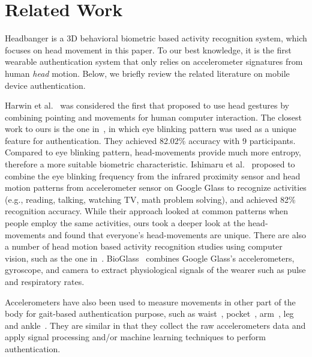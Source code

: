 \section{Related Work}\label{sec:related}
Headbanger is a 3D behavioral biometric based
activity recognition system, which focuses on head movement in this paper. 
To our best knowledge, it is the first wearable authentication system that only relies on
accelerometer signatures from human \emph{head} motion. Below, we briefly review the related literature on mobile device authentication.


Harwin et al.~\cite{harwin1990analysis} was considered the first that
proposed to use head gestures by combining pointing and movements
for human computer interaction. The closest work to ours is
the one in~\cite{westeyn2004recognizing}, in which eye
blinking pattern was used as a unique feature for
authentication. They achieved 82.02\% accuracy with 9 participants. Compared to eye blinking pattern, head-movements provide much more entropy, therefore a more suitable biometric characteristic. 
Ishimaru et al.~\cite{ishimaru2014blink} proposed to combine the eye blinking frequency from the infrared proximity sensor and head motion patterns from accelerometer sensor on Google Glass
to recognize activities (e.g., reading, talking, watching TV,
math problem solving), and achieved 82\% recognition
accuracy. While their approach looked at common patterns when people employ the same activities, ours took a deeper look at the head-movements and found that everyone's head-movements are unique. There are also a number of head
motion based activity recognition studies using computer vision, such
as the one in~\cite{kjeldsen2001head}. BioGlass~\cite{hernandezbioglass}
combines Google Glass's accelerometers, gyroscope, and camera to
extract physiological signals of the wearer such as pulse
and respiratory rates.

Accelerometers have also been used to measure movements in other part of the
body for gait-based authentication purpose, such as
waist~\cite{ailisto2005identifying}, pocket~\cite{gafurov2007gait},
arm~\cite{okumura2006study,gafurov2008arm},
leg~\cite{gafurov2006biometric} and ankle~\cite{gafurov2011user}.
They are similar in that they collect the raw accelerometers data
and apply signal processing and/or machine learning techniques  to perform
authentication.


